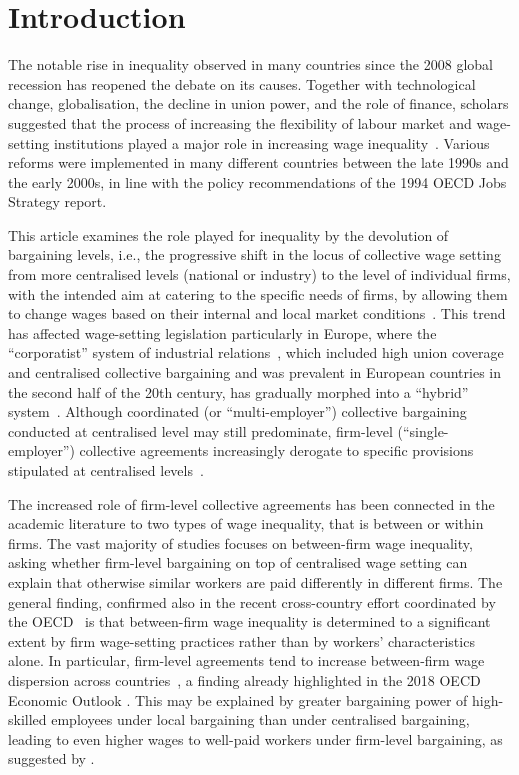 \documentclass[12pt]{article}
\begin{document}
\cleardoublepage

\onehalfspacing

\section{Introduction}
\label{sec:intro}
The notable rise in inequality observed in many countries since the 2008 global recession has reopened the debate on its causes. Together with technological change, globalisation, the decline in union power, and the role of finance, scholars suggested that the process of increasing the flexibility of labour market and wage-setting institutions played a major role in increasing wage inequality~\citep{cobb2016}. Various reforms were implemented in many different countries between the late 1990s and the early 2000s, in line with the policy recommendations of the 1994 OECD Jobs Strategy report. 

This article examines the role played for inequality by the devolution of bargaining levels, i.e., the progressive shift in the locus of collective wage setting from more centralised levels (national or industry) to the level of individual firms, with the intended aim at catering to the specific needs of firms, by allowing them to change wages based on their internal and local market conditions~\citep{undy1978}. This trend has affected wage-setting legislation particularly in Europe, where the “corporatist” system of industrial relations~\citep{wallerstein1997unions}, which included high union coverage and centralised collective bargaining and was prevalent in European countries in the second half of the 20th century, has gradually morphed into a “hybrid” system~\citep{Braakmann}. Although coordinated (or “multi-employer”) collective bargaining conducted at centralised level may still predominate, firm-level (“single-employer”) collective agreements increasingly derogate to specific provisions stipulated at centralised levels~\citep{visser2013wage}.

The increased role of firm-level collective agreements has been connected in the academic literature to two types of wage inequality, that is between or within firms. The vast majority of studies focuses on between-firm wage inequality, asking whether firm-level bargaining on top of centralised wage setting can explain that otherwise similar workers are paid differently in different firms. The general finding, confirmed also in the recent cross-country effort coordinated by the OECD~\citep{criscuolo2020,criscuolo2021,criscuolo2023} is that between-firm wage inequality is determined to a significant extent by firm wage-setting practices rather than by workers' characteristics alone. In particular, firm-level agreements tend to increase between-firm wage dispersion across countries~\citep{Berlingieri2017}, a finding already highlighted in the 2018 OECD Economic Outlook \citep{OECD2018}. This may be explained by greater bargaining power of high-skilled employees under local bargaining than under centralised bargaining, leading to even higher wages to well-paid workers under firm-level bargaining, as suggested by \cite{dahl.lemaire.ea.2013}.
\end{document}
